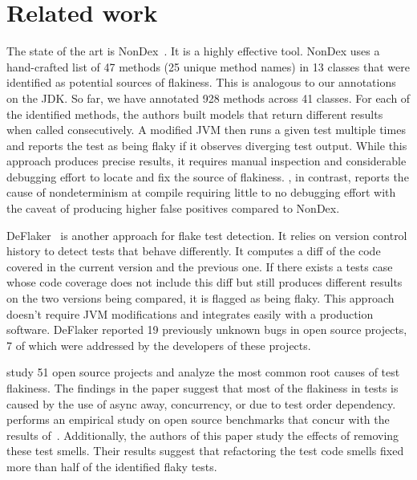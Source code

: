 \section{Related work}\label{sec:related}


The state of the art is NonDex~\cite{nondex}.  It is a highly effective tool.
NonDex uses a hand-crafted list of 47 methods (25 unique method names)
in 13 classes that were identified as potential sources of flakiness. 
This is analogous to our annotations on the JDK\@. So far, we have annotated
928 methods across 41 classes.
For each of the identified methods, the authors built models that
return different results when called consecutively. A modified JVM then
runs a given test multiple times and reports the test as being flaky if it observes
diverging test output. While this approach produces precise results, it requires manual inspection
and considerable debugging effort to locate and fix the source of flakiness. \TheDeterminismChecker, in
contrast, reports the cause of nondeterminism at compile requiring little to no debugging effort with the
caveat of producing higher false positives compared to NonDex.

DeFlaker~\cite{deflaker} is another approach for flake test detection. It relies on
version control history to detect tests that behave differently. It computes a diff of the code covered
in the current version and the previous one. If there exists a tests case whose code coverage does not include
this diff but still produces different results on the two versions being compared, it is flagged as being flaky.
This approach doesn't require JVM modifications
and integrates easily with a production software. DeFlaker reported 19 previously unknown bugs
in open source projects, 7 of which were addressed by the developers of these projects.

\cite{LuoHEM2014} study 51 open source projects and analyze the most common root causes of
test flakiness. The findings in the paper suggest that most of the flakiness in tests is caused by
the use of async away, concurrency, or due to test order dependency.~\cite{Plotkin:1993:LPP:645891.671433}
performs an empirical study on open source benchmarks that concur with the results of~\cite{LuoHEM2014}.
Additionally, the authors of this paper study the effects of removing these test smells. Their results suggest that
refactoring the test code smells fixed more than half of the identified flaky tests.


